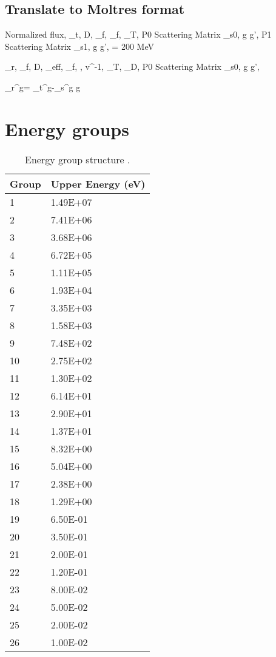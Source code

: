 \documentclass[11pt,letterpaper]{article}
\begin{document}
\subsection{Translate to Moltres format}

Normalized flux, \Sigma_t, D, \nu\Sigma_f, \Sigma_f, \chi_T, P0 Scattering Matrix \Sigma_{s0, g \rightarrow g'}, P1 Scattering Matrix \Sigma_{s1, g \rightarrow g'}, \Kappa = 200 MeV

\Sigma_r, \nu\Sigma_f, D, \beta_{eff}, \Sigma_f, \Kappa, v^{-1}, \chi_T, \chi_D, P0 Scattering Matrix \Sigma_{s0, g \rightarrow g'}, \lambda

\Sigma_r^g= \Sigma_t^g-\Sigma_s^{g \rightarrow g}

\section{Energy groups}

\begin{table}[htbp!]
  \centering
    \caption{Energy group structure \cite{gougar_prismatic_2010}.}
  \begin{tabular}{ll}
    \toprule
  Group   & Upper Energy (eV) \\ \midrule
  1   & 1.49E+07      \\
  2   & 7.41E+06      \\
  3   & 3.68E+06      \\
  4   & 6.72E+05      \\
  5   & 1.11E+05      \\
  6   & 1.93E+04      \\
  7   & 3.35E+03      \\
  8   & 1.58E+03      \\
  9   & 7.48E+02      \\
  10    & 2.75E+02      \\
  11    & 1.30E+02      \\
  12    & 6.14E+01      \\
  13    & 2.90E+01      \\
  14    & 1.37E+01      \\
  15    & 8.32E+00      \\
  16    & 5.04E+00      \\
  17    & 2.38E+00      \\
  18    & 1.29E+00      \\
  19    & 6.50E-01      \\
  20    & 3.50E-01      \\
  21    & 2.00E-01      \\
  22    & 1.20E-01      \\
  23    & 8.00E-02      \\
  24    & 5.00E-02      \\
  25    & 2.00E-02      \\
  26    & 1.00E-02      \\
    \bottomrule
  \end{tabular}
    \label{tab:energygroups}
\end{table}


\pagebreak


\end{document}
